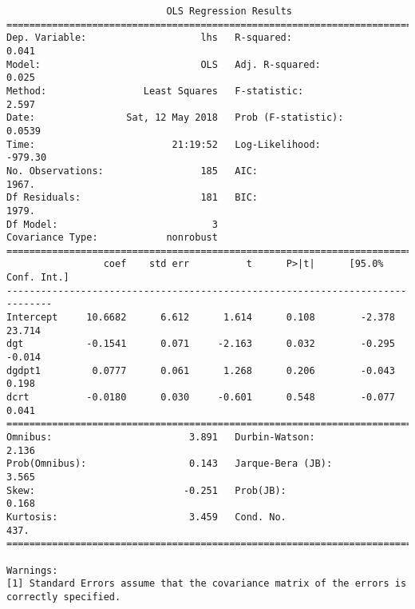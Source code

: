 \documentclass[12pt,fleqn]{article}\usepackage{../../common}
\begin{document}
\begin{verbatim}
                            OLS Regression Results                            
==============================================================================
Dep. Variable:                    lhs   R-squared:                       0.041
Model:                            OLS   Adj. R-squared:                  0.025
Method:                 Least Squares   F-statistic:                     2.597
Date:                Sat, 12 May 2018   Prob (F-statistic):             0.0539
Time:                        21:19:52   Log-Likelihood:                -979.30
No. Observations:                 185   AIC:                             1967.
Df Residuals:                     181   BIC:                             1979.
Df Model:                           3                                         
Covariance Type:            nonrobust                                         
==============================================================================
                 coef    std err          t      P>|t|      [95.0% Conf. Int.]
------------------------------------------------------------------------------
Intercept     10.6682      6.612      1.614      0.108        -2.378    23.714
dgt           -0.1541      0.071     -2.163      0.032        -0.295    -0.014
dgdpt1         0.0777      0.061      1.268      0.206        -0.043     0.198
dcrt          -0.0180      0.030     -0.601      0.548        -0.077     0.041
==============================================================================
Omnibus:                        3.891   Durbin-Watson:                   2.136
Prob(Omnibus):                  0.143   Jarque-Bera (JB):                3.565
Skew:                          -0.251   Prob(JB):                        0.168
Kurtosis:                       3.459   Cond. No.                         437.
==============================================================================

Warnings:
[1] Standard Errors assume that the covariance matrix of the errors is correctly specified.
\end{verbatim}
\end{document}
